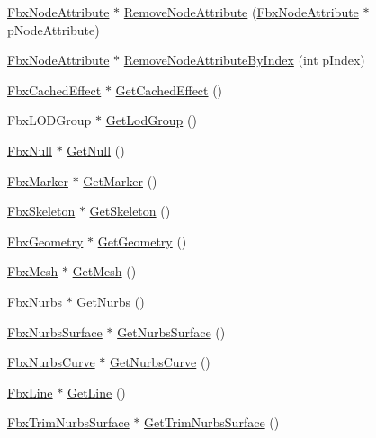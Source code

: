 \begin{Indent}
\begin{DoxyCompactItemize}
\item 
\hyperlink{class_fbx_node_attribute}{Fbx\+Node\+Attribute} $\ast$ \hyperlink{class_fbx_node_a2ec597897a0eba7c5efbc3f381dbeb72}{Remove\+Node\+Attribute} (\hyperlink{class_fbx_node_attribute}{Fbx\+Node\+Attribute} $\ast$p\+Node\+Attribute)
\item 
\hyperlink{class_fbx_node_attribute}{Fbx\+Node\+Attribute} $\ast$ \hyperlink{class_fbx_node_a76253e3586deb4a9c3d4199d8c095438}{Remove\+Node\+Attribute\+By\+Index} (int p\+Index)
\item 
\hyperlink{class_fbx_cached_effect}{Fbx\+Cached\+Effect} $\ast$ \hyperlink{class_fbx_node_a1cb6d216af155fc50e4b3d3acbbfdb4b}{Get\+Cached\+Effect} ()
\item 
Fbx\+L\+O\+D\+Group $\ast$ \hyperlink{class_fbx_node_ad166be1f7935f76ecebcfa64b86029f6}{Get\+Lod\+Group} ()
\item 
\hyperlink{class_fbx_null}{Fbx\+Null} $\ast$ \hyperlink{class_fbx_node_a2683facd88f4185a901adf108e672368}{Get\+Null} ()
\item 
\hyperlink{class_fbx_marker}{Fbx\+Marker} $\ast$ \hyperlink{class_fbx_node_ad677aa3c8a820b43abedc6cf9c6df9f5}{Get\+Marker} ()
\item 
\hyperlink{class_fbx_skeleton}{Fbx\+Skeleton} $\ast$ \hyperlink{class_fbx_node_a9e676ab9c1b18058e2b968f9374d059b}{Get\+Skeleton} ()
\item 
\hyperlink{class_fbx_geometry}{Fbx\+Geometry} $\ast$ \hyperlink{class_fbx_node_ad468c7358b16812dd56efe9255dfc355}{Get\+Geometry} ()
\item 
\hyperlink{class_fbx_mesh}{Fbx\+Mesh} $\ast$ \hyperlink{class_fbx_node_a7e9e1ea8c34e823782cb778e197a03e0}{Get\+Mesh} ()
\item 
\hyperlink{class_fbx_nurbs}{Fbx\+Nurbs} $\ast$ \hyperlink{class_fbx_node_adcf7d45de6929b0f9b71d1e302eb24da}{Get\+Nurbs} ()
\item 
\hyperlink{class_fbx_nurbs_surface}{Fbx\+Nurbs\+Surface} $\ast$ \hyperlink{class_fbx_node_abddb891023f93474f91e443f2c523d5f}{Get\+Nurbs\+Surface} ()
\item 
\hyperlink{class_fbx_nurbs_curve}{Fbx\+Nurbs\+Curve} $\ast$ \hyperlink{class_fbx_node_a5a57feb5e988b184bef84058f53e3184}{Get\+Nurbs\+Curve} ()
\item 
\hyperlink{class_fbx_line}{Fbx\+Line} $\ast$ \hyperlink{class_fbx_node_ab13914697ec7b20a2a2b77cb77b5d3af}{Get\+Line} ()
\item 
\hyperlink{class_fbx_trim_nurbs_surface}{Fbx\+Trim\+Nurbs\+Surface} $\ast$ \hyperlink{class_fbx_node_a62a5a3fc9010e5686639bc714d2a29f6}{Get\+Trim\+Nurbs\+Surface} ()

\end{DoxyCompactItemize}
\end{Indent}
